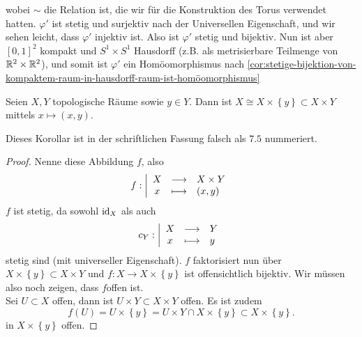 \begin{example}
\begin{enumerate}[a)]
\begin{tikzcd}
           \end{tikzcd}
           wobei $\sim $ die Relation ist, die wir für die Konstruktion des Torus verwendet hatten. $\varphi '$ ist stetig und surjektiv nach der Universellen Eigenschaft, und wir sehen leicht, dass $\varphi '$ injektiv ist. Also ist $\varphi '$ stetig und bijektiv. Nun ist aber $[0,1]^2$ kompakt und $S^1 \times S^1$ Hausdorff (z.B. als metrisierbare Teilmenge von $\R^2 \times \R^2$), und somit ist $\varphi '$ ein Homöomorphismus nach \autoref{cor:stetige-bijektion-von-kompaktem-raum-in-hausdorff-raum-ist-homöomorphismus}
    \end{enumerate}
\end{example}
\begin{corollary}\label{cor:topologischer-raum-ist-natürlich-in-seinem-produkt-enthalten}
    Seien $X,Y$ topologische Räume sowie  $y\in Y$. Dann ist $X\cong X\times \left \{y\right\} \subset X\times Y$ mittels $x \mapsto (x,y)$.
\end{corollary}
\iflecturenumbers
\begin{remark*}[Nummerierung]   
    Dieses Korollar ist in der schriftlichen Fassung falsch als $7.5$ nummeriert.
\end{remark*}
\fi
\begin{proof}
    Nenne diese Abbildung $f$, also
        \begin{equation*}
        f: \left| \begin{array}{c c l} 
        X & \longrightarrow & X\times Y \\
        x & \longmapsto &  (x,y)
        \end{array} \right.
    \end{equation*}
$f$ ist stetig, da sowohl  $\id_X$ als auch
    \begin{equation*}
    c_Y: \left| \begin{array}{c c l} 
    X & \longrightarrow & Y \\
    x & \longmapsto &  y
    \end{array} \right.
\end{equation*}
stetig sind (mit universeller Eigenschaft). $f$ faktorisiert nun über  $X\times \left \{y\right\} \subset X\times Y$ und $f: X \to  X\times \left \{y\right\} $ ist offensichtlich bijektiv. Wir müssen also noch zeigen, dass $f$offen ist. \\
Sei  $U\subset X$ offen, dann ist $U\times Y \subset X\times Y$ offen. Es ist zudem
\[
    f(U) = U\times \left \{y\right\}  = U\times Y \cap  X \times \left \{y\right\}  \subset X\times \left \{y\right\} 
.\] 
in $X\times \left \{y\right\} $ offen.
\end{proof}
